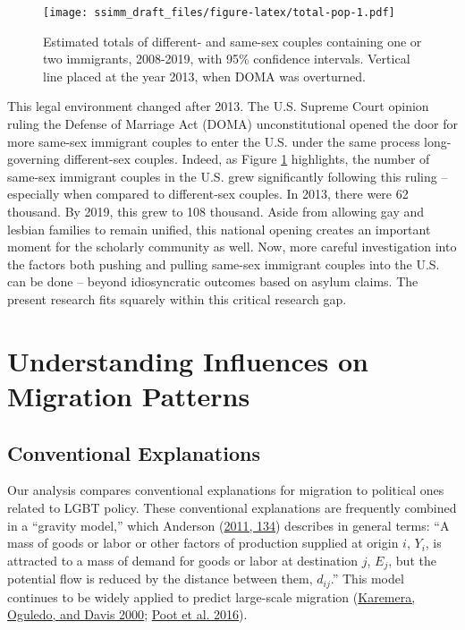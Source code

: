 \documentclass[
  11pt,
]{article}
\begin{document}
\begin{figure}
\centering
\texttt{[image: ssimm\_draft\_files/figure-latex/total-pop-1.pdf]}
\caption{\label{fig:total-pop}Estimated totals of different- and same-sex couples containing one or two immigrants, 2008-2019, with 95\% confidence intervals. Vertical line placed at the year 2013, when DOMA was overturned.}
\end{figure}

This legal environment changed after 2013. The U.S. Supreme Court opinion ruling the Defense of Marriage Act (DOMA) unconstitutional opened the door for more same-sex immigrant couples to enter the U.S. under the same process long-governing different-sex couples. Indeed, as Figure \ref{fig:total-pop} highlights, the number of same-sex immigrant couples in the U.S. grew significantly following this ruling -- especially when compared to different-sex couples. In 2013, there were 62 thousand. By 2019, this grew to 108 thousand. Aside from allowing gay and lesbian families to remain unified, this national opening creates an important moment for the scholarly community as well. Now, more careful investigation into the factors both pushing and pulling same-sex immigrant couples into the U.S. can be done -- beyond idiosyncratic outcomes based on asylum claims. The present research fits squarely within this critical research gap.

\hypertarget{understanding-influences-on-migration-patterns}{%
\section{Understanding Influences on Migration Patterns}\label{understanding-influences-on-migration-patterns}}

\hypertarget{conventional-explanations}{%
\subsection{Conventional Explanations}\label{conventional-explanations}}

Our analysis compares conventional explanations for migration to political ones related to LGBT policy. These conventional explanations are frequently combined in a ``gravity model,'' which Anderson (\protect\hyperlink{ref-anderson_2011}{2011, 134}) describes in general terms: ``A mass of goods or labor or other factors of production supplied at origin \(i\), \(Y_i\), is attracted to a mass of demand for goods or labor at destination \(j\), \(E_j\), but the potential flow is reduced by the distance between them, \(d_{ij}\).'' This model continues to be widely applied to predict large-scale migration (\protect\hyperlink{ref-karemera_2000}{Karemera, Oguledo, and Davis 2000}; \protect\hyperlink{ref-poot_2016}{Poot et al. 2016}).
\end{document}
